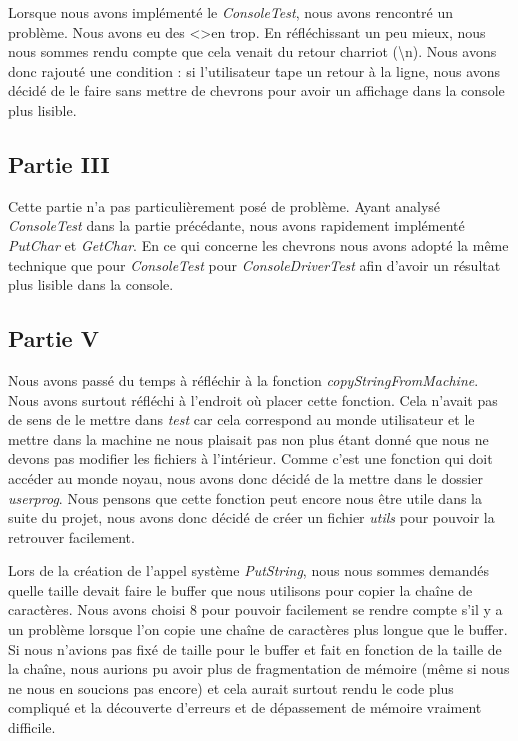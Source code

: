 \documentclass{article}
\begin{document}
Lorsque nous avons implémenté le \textit{ConsoleTest}, nous avons rencontré un
problème. Nous avons eu des \textless \textgreater en trop. En réfléchissant un
peu mieux, nous nous sommes rendu compte que cela venait du retour charriot
(\textbackslash n). Nous avons donc rajouté une condition : si l'utilisateur
tape un retour à la ligne, nous avons décidé de le faire sans mettre de
chevrons pour avoir un affichage dans la console plus lisible.

\subsection{Partie III}
Cette partie n'a pas particulièrement posé de problème. Ayant analysé
\textit{ConsoleTest} dans la partie précédante, nous avons rapidement
implémenté \textit{PutChar} et \textit{GetChar}. En ce qui concerne les
chevrons nous avons adopté la même technique que pour \textit{ConsoleTest} pour
\textit{ConsoleDriverTest} afin d'avoir un résultat plus lisible dans la
console.

\subsection{Partie V}
Nous avons passé du temps à réfléchir à la fonction
\textit{copyStringFromMachine}. Nous avons surtout réfléchi à l'endroit où
placer cette fonction. Cela n'avait pas de sens de le mettre dans \textit{test}
car cela correspond au monde utilisateur et le mettre dans la machine ne nous
plaisait pas non plus étant donné que nous ne devons pas modifier les fichiers
à l'intérieur. Comme c'est une fonction qui doit accéder au monde noyau, nous
avons donc décidé de la mettre dans le dossier \textit{userprog}. Nous pensons
que cette fonction peut encore nous être utile dans la suite du projet, nous
avons donc décidé de créer un fichier \textit{utils} pour pouvoir la retrouver
facilement.

Lors de la création de l'appel système \textit{PutString}, nous nous sommes
demandés quelle taille devait faire le buffer que nous utilisons pour copier la
chaîne de caractères. Nous avons choisi 8 pour pouvoir facilement se rendre
compte s'il y a un problème lorsque l'on copie une chaîne de caractères plus
longue que le buffer. Si nous n'avions pas fixé de taille pour le buffer et
fait en fonction de la taille de la chaîne, nous aurions pu avoir plus de
fragmentation de mémoire (même si nous ne nous en soucions pas encore) et cela
aurait surtout rendu le code plus compliqué et la découverte d'erreurs et de
dépassement de mémoire vraiment difficile.
\end{document}
